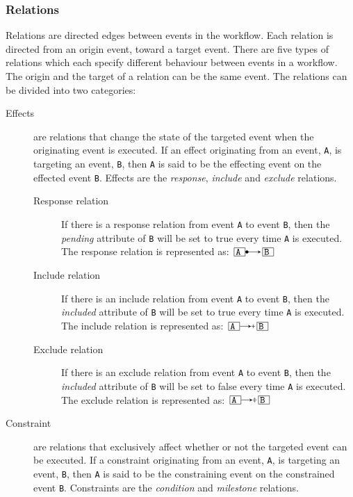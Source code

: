 \documentclass{article}
\begin{document}
			\subsubsection{Relations}
			\label{subsubsec:relations}

			Relations are directed edges between events in the workflow.
			Each relation is directed from an origin event, toward a target event.
			There are five types of relations which each specify different behaviour between events in a workflow.
			The origin and the target of a relation can be the same event.
			The relations can be divided into two categories:

			\begin{description}
				\item[Effects] are relations that change the state of the targeted event when the originating event is executed.
				If an effect originating from an event, \texttt{A}, is targeting an event, \texttt{B}, then \texttt{A} is said to be the effecting event on the effected event \texttt{B}.
				Effects are the \emph{response}, \emph{include} and \emph{exclude} relations.
				\begin{description}
					\item[Response relation] If there is a response relation from event \texttt{A} to event \texttt{B}, then the \textit{pending} attribute of \texttt{B} will be set to true every time \texttt{A} is executed.
				The response relation is represented as: $\ev{A} \rrel \ev{B}$
					\item[Include relation] If there is an include relation from event \texttt{A} to event \texttt{B}, then the \textit{included} attribute of \texttt{B} will be set to true every time \texttt{A} is executed.
				The include relation is represented as: $\ev{A} \irel \ev{B}$
					\item[Exclude relation] If there is an exclude relation from event \texttt{A} to event \texttt{B}, then the \textit{included} attribute of \texttt{B} will be set to false every time \texttt{A} is executed.
				The exclude relation is represented as: $\ev{A} \erel \ev{B}$
				\end{description}
				\item[Constraint] are relations that exclusively affect whether or not the targeted event can be executed.
				If a constraint originating from an event, \texttt{A}, is targeting an event, \texttt{B}, then \texttt{A} is said to be the constraining event on the constrained event \texttt{B}.
				Constraints are the \emph{condition} and \emph{milestone} relations.

\end{description}
\end{document}
